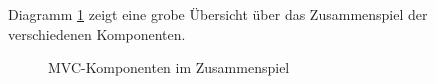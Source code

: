 \newpage
Diagramm \ref{fig:mvcComponentDiagramm} zeigt eine grobe Übersicht über das Zusammenspiel der verschiedenen Komponenten.

\begin{figure}[ht!]
	\centering{
		
	}

	\caption{MVC-Komponenten im Zusammenspiel}
	\label{fig:mvcComponentDiagramm}
\end{figure}